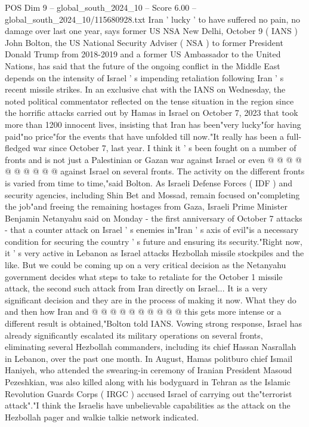 \begin{textsample}{POS Dim 9 – global\_south\_2024\_10 – Score 6.00 – global\_south\_2024\_10/115680928.txt}  \label{ex:f9_pos_089}
Iran ' lucky ' to have suffered no pain, no damage over last one year, says former US NSA New Delhi, October 9 ( IANS ) John Bolton, the US National Security Adviser ( NSA ) to former President Donald Trump from 2018-2019 and a former US Ambassador to the United Nations, has said that the future of the ongoing conflict in the Middle East depends on the intensity of Israel ' s impending retaliation following Iran ' s recent missile strikes.
In an exclusive chat with the IANS on Wednesday, the noted political commentator reflected on the tense situation in the region since the horrific attacks carried out by Hamas in Israel on October 7, 2023 that took more than 1200 innocent lives, insisting that Iran has been"very lucky"for having paid"no price"for the events that have unfolded till now."It really has been a full-fledged war since October 7, last year.
I think it ' s been fought on a number of fronts and is not just a Palestinian or Gazan war against Israel or even @ @ @ @ @ @ @ @ @ @ against Israel on several fronts.
The activity on the different fronts is varied from time to time,"said Bolton.
As Israeli Defense Forces ( IDF ) and security agencies, including Shin Bet and Mossad, remain focused on"completing the job"and freeing the remaining hostages from Gaza, Israeli Prime Minister Benjamin Netanyahu said on Monday - the first anniversary of October 7 attacks - that a counter attack on Israel ' s enemies in"Iran ' s axis of evil"is a necessary condition for securing the country ' s future and ensuring its security."Right now, it ' s very active in Lebanon as Israel attacks Hezbollah missile stockpiles and the like.
But we could be coming up on a very critical decision as the Netanyahu government decides what steps to take to retaliate for the October 1 missile attack, the second such attack from Iran directly on Israel...
It is a very significant decision and they are in the process of making it now.
What they do and then how Iran and @ @ @ @ @ @ @ @ @ @ this gets more intense or a different result is obtained,"Bolton told IANS.
Vowing strong response, Israel has already significantly escalated its military operations on several fronts, eliminating several Hezbollah commanders, including its chief Hassan Nasrallah in Lebanon, over the past one month.
In August, Hamas politburo chief Ismail Haniyeh, who attended the swearing-in ceremony of Iranian President Masoud Pezeshkian, was also killed along with his bodyguard in Tehran as the Islamic Revolution Guards Corps ( IRGC ) accused Israel of carrying out the"terrorist attack"."I think the Israelis have unbelievable capabilities as the attack on the Hezbollah pager and walkie talkie network indicated.

\end{textsample}
